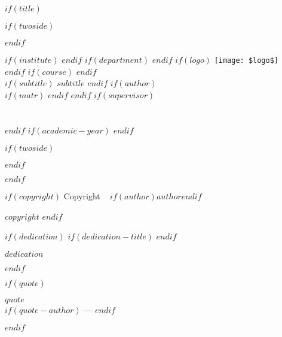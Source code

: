 \documentclass[
$if(twoside)$
twoside,
$endif$
$if(openright)$
openright,
$endif$
$if(title)$
titlepage,
$endif$
numbers=noenddot,
headinclude,
footinclude,
cleardoublepage=empty,
abstract=on,
$if(paper)$
paper=$paper$,
$endif$
$if(fontsize)$
fontsize=$fontsize$
$endif$
BCOR=5mm
]{scrreprt}
\begin{document}

$if(title)$
\begin{titlepage}

\pagestyle{plain}
$if(twoside)$
\begin{addmargin}[-1cm]{-3cm}
$endif$
\begin{center}
\Large

$if(institute)$
$endif$
$if(department)$
$endif$
$if(logo)$
\vfill
\texttt{[image: \$logo\$]} \\ \medskip
$endif$
$if(course)$			
$endif$
\vfill
\begingroup
\color{CTtitle} \\ \bigskip
\endgroup
$if(subtitle)$
\medskip
\textit{$subtitle$}
$endif$
\vfill
$if(author)$
 \\
$if(matr)$
$endif$
$endif$
\vfill
$if(supervisor)$
\\
\\
\\
$endif$
\vfill
$if(academic-year)$
\vfill
{}
$endif$
\end{center}
$if(twoside)$
\end{addmargin}
$endif$
\end{titlepage}
$endif$

$if(copyright)$
\clearpage
\thispagestyle{empty}
\hfill
\vfill
\noindent Copyright
\textcopyright\ \the\year{} $if(author)$$author$$endif$

\bigskip
\noindent $copyright$
$endif$

$if(dedication)$
\cleardoublepage
\thispagestyle{empty}
$if(dedication-title)$
$endif$
\vspace*{3cm}
\begin{flushright}
\textit{$dedication$}
\end{flushright}
$endif$

$if(quote)$
\cleardoublepage
\thispagestyle{empty}
\vspace*{3cm}
\begin{flushright}
\textit{$quote$}\\ \medskip
$if(quote-author)$        
--- 
$endif$
\end{flushright}
$endif$
\end{document}
